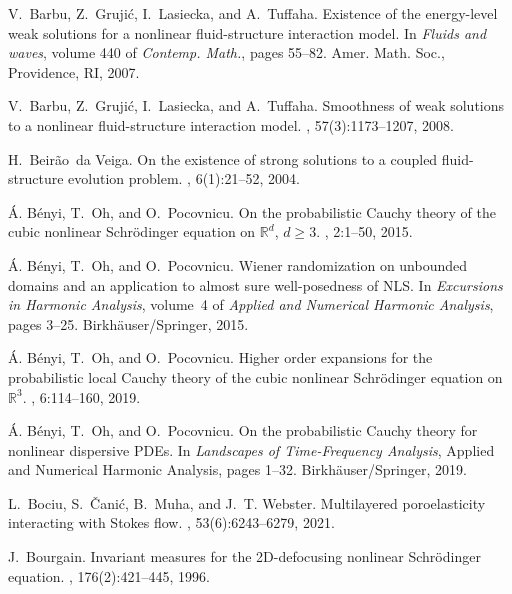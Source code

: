 \documentclass[letterpaper, 11pt,  reqno]{amsart}
\newcommand{\1}{\hspace{0.5mm}\text{I}\hspace{0.2mm}}
\numberwithin{equation}{section}
\numberwithin{theorem}{section}
\begin{document}
\begin{thebibliography}{10}

V.~Barbu, Z.~Gruji\'{c}, I.~Lasiecka, and A.~Tuffaha.
\newblock Existence of the energy-level weak solutions for a nonlinear
  fluid-structure interaction model.
\newblock In {\em Fluids and waves}, volume 440 of {\em Contemp. Math.}, pages
  55--82. Amer. Math. Soc., Providence, RI, 2007.

V.~Barbu, Z.~Gruji\'{c}, I.~Lasiecka, and A.~Tuffaha.
\newblock Smoothness of weak solutions to a nonlinear fluid-structure
  interaction model.
, 57(3):1173--1207, 2008.

H.~Beir\~{a}o~da Veiga.
\newblock On the existence of strong solutions to a coupled fluid-structure
  evolution problem.
, 6(1):21--52, 2004.

\'{A}. B\'{e}nyi, T.~Oh, and O.~Pocovnicu.
\newblock On the probabilistic {C}auchy theory of the cubic nonlinear
  {S}chr\"{o}dinger equation on $\mathbb{R}^{d}$, $d \ge 3$.
, 2:1--50, 2015.

\'{A}. B\'{e}nyi, T.~Oh, and O.~Pocovnicu.
\newblock Wiener randomization on unbounded domains and an application to
  almost sure well-posedness of {N}{L}{S}.
\newblock In {\em Excursions in Harmonic Analysis}, volume~4 of {\em Applied
  and Numerical Harmonic Analysis}, pages 3--25. Birkh\"auser/Springer, 2015.

\'{A}. B\'{e}nyi, T.~Oh, and O.~Pocovnicu.
\newblock Higher order expansions for the probabilistic local {C}auchy theory
  of the cubic nonlinear {S}chr\"odinger equation on $\mathbb{R}^3$.
, 6:114--160, 2019.

\'{A}. B\'{e}nyi, T.~Oh, and O.~Pocovnicu.
\newblock On the probabilistic {C}auchy theory for nonlinear dispersive
  {P}{D}{E}s.
\newblock In {\em Landscapes of Time-Frequency Analysis}, Applied and Numerical
  Harmonic Analysis, pages 1--32. Birkh\"auser/Springer, 2019.

L.~Bociu, S.~\v{C}ani\'{c}, B.~Muha, and J.~T. Webster.
\newblock Multilayered poroelasticity interacting with {S}tokes flow.
, 53(6):6243--6279, 2021.

J.~Bourgain.
\newblock Invariant measures for the 2{D}-defocusing nonlinear
  {S}chr\"{o}dinger equation.
, 176(2):421--445, 1996.


\end{thebibliography}
\end{document}
